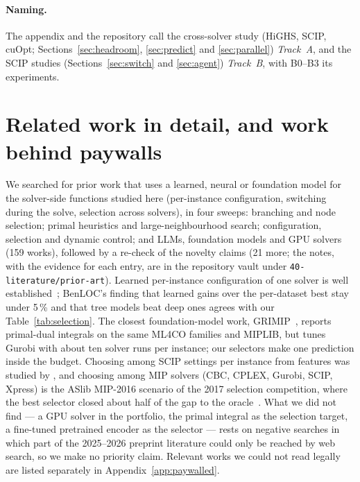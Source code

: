 \paragraph{Naming.} The appendix and the repository call the cross-solver study (HiGHS, SCIP, cuOpt; Sections~\ref{sec:headroom},
\ref{sec:predict} and \ref{sec:parallel}) \emph{Track~A}, and the SCIP studies (Sections~\ref{sec:switch} and
\ref{sec:agent}) \emph{Track~B}, with B0--B3 its experiments.

\section{Related work in detail, and work behind paywalls}\label{app:related}
We searched for prior work that uses a learned, neural or foundation model for the solver-side functions studied here
(per-instance configuration, switching during the solve, selection across solvers), in four sweeps: branching and node
selection; primal heuristics and large-neighbourhood search; configuration, selection and dynamic control; and LLMs,
foundation models and GPU solvers (159 works), followed by a re-check of the novelty claims (21 more; the notes, with the evidence for each entry, are in the repository vault
under \texttt{40-literature/prior-art}). Learned per-instance configuration of one solver is well
established~\citep{xu2011hydramip,valentin2022instance,li2025benloc}; BenLOC's finding that learned gains over the
per-dataset best stay under 5\,\% and that tree models beat deep ones agrees with our Table~\ref{tab:selection}. The
closest foundation-model work, GRIMIP~\citep{luo2026grimip}, reports primal-dual integrals on the same ML4CO families
and MIPLIB, but tunes Gurobi with about ten solver runs per instance; our selectors make one prediction inside the
budget. Choosing among SCIP settings per instance from features was studied by \citet{georges2018selection}, and
choosing among MIP solvers (CBC, CPLEX, Gurobi, SCIP, Xpress) is the ASlib MIP-2016 scenario of the 2017 selection
competition, where the best selector closed about half of the gap to the oracle~\citep{lindauer2019oasc}. What we did
not find --- a GPU solver in the portfolio, the primal integral as the selection target, a fine-tuned pretrained encoder
as the selector --- rests on negative searches in which part of the 2025--2026 preprint literature could only be
reached by web search, so we make no priority claim. Relevant works we could not read legally are listed separately in Appendix~\ref{app:paywalled}.

